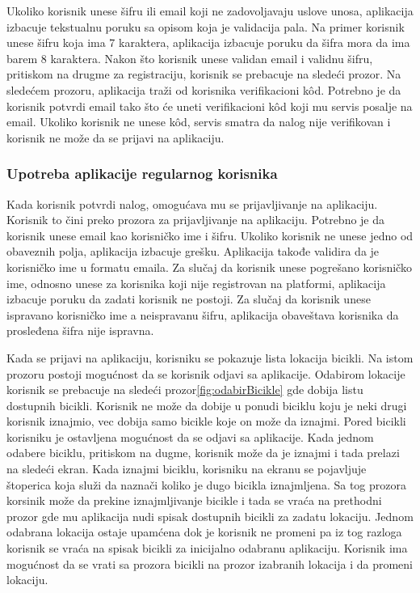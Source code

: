 \documentclass[12pt,oneside]{memoir}
\begin{document}
 
Ukoliko korisnik unese šifru ili email koji ne zadovoljavaju uslove unosa, aplikacija izbacuje tekstualnu poruku sa opisom koja je validacija pala. Na primer korisnik unese šifru koja ima 7 karaktera, aplikacija izbacuje poruku da šifra mora da ima barem 8 karaktera. Nakon što korisnik unese validan email i validnu šifru, pritiskom na drugme za registraciju, korisnik se prebacuje na sledeći prozor. Na sledećem prozoru, aplikacija traži od korisnika verifikacioni kôd. Potrebno je da korisnik potvrdi email tako što će uneti verifikacioni kôd koji mu servis posalje na email. Ukoliko korisnik ne unese kôd, servis smatra da nalog nije verifikovan i korisnik ne može da se prijavi na aplikaciju.
 
\subsubsection{Upotreba aplikacije regularnog korisnika}
 
Kada korisnik potvrdi nalog, omogućava mu se prijavljivanje na aplikaciju. Korisnik to čini preko prozora za prijavljivanje na aplikaciju. Potrebno je da korisnik unese email kao korisničko ime i šifru. Ukoliko korisnik ne unese jedno od obaveznih polja, aplikacija izbacuje grešku. Aplikacija takođe validira da je korisničko ime u formatu emaila. Za slučaj da korisnik unese pogrešano korisničko ime, odnosno unese za korisnika koji nije registrovan na platformi, aplikacija izbacuje poruku da zadati korisnik ne postoji. Za slučaj da korisnik unese ispravano korisničko ime a neispravanu šifru, aplikacija obaveštava korisnika da prosleđena šifra nije ispravna.
 
Kada se prijavi na aplikaciju, korisniku se pokazuje lista lokacija bicikli. Na istom prozoru postoji mogućnost da se korisnik odjavi sa aplikacije. Odabirom lokacije korisnik se prebacuje na sledeći prozor\ref{fig:odabirBicikle} gde dobija listu dostupnih bicikli. Korisnik ne može da dobije u ponudi biciklu koju je neki drugi korisnik iznajmio, vec dobija samo bicikle koje on može da iznajmi. Pored bicikli korisniku je ostavljena mogućnost da se odjavi sa aplikacije. Kada jednom odabere biciklu, pritiskom na dugme, korisnik može da je iznajmi i tada prelazi na sledeći ekran. Kada iznajmi biciklu, korisniku na ekranu se pojavljuje štoperica koja služi da naznači koliko je dugo bicikla iznajmljena. Sa tog prozora korsinik može da prekine iznajmljivanje bicikle i tada se vraća na prethodni prozor gde mu aplikacija nudi spisak dostupnih bicikli za zadatu lokaciju. Jednom odabrana lokacija ostaje upamćena dok je korisnik ne promeni pa iz tog razloga korisnik se vraća na spisak bicikli za inicijalno odabranu aplikaciju. Korisnik ima mogućnost da se vrati sa prozora bicikli na prozor izabranih lokacija i da promeni lokaciju.
 
\end{document}
